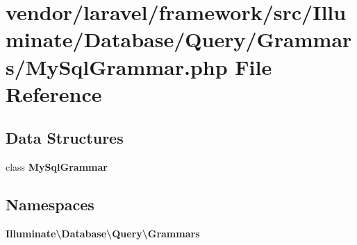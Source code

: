 \section{vendor/laravel/framework/src/\+Illuminate/\+Database/\+Query/\+Grammars/\+My\+Sql\+Grammar.php File Reference}
\label{_query_2_grammars_2_my_sql_grammar_8php}
\subsection*{Data Structures}
\begin{DoxyCompactItemize}
\item 
class {\bf My\+Sql\+Grammar}
\end{DoxyCompactItemize}
\subsection*{Namespaces}
\begin{DoxyCompactItemize}
\item 
 {\bf Illuminate\textbackslash{}\+Database\textbackslash{}\+Query\textbackslash{}\+Grammars}
\end{DoxyCompactItemize}
